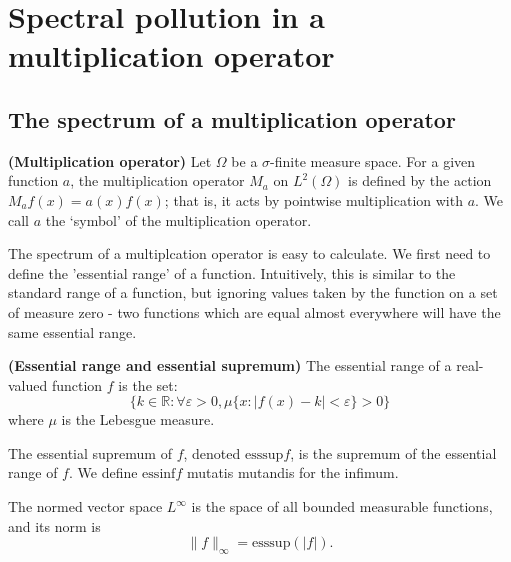 \documentclass[../main.tex]{subfiles}
\begin{document}
\section{Spectral pollution in a multiplication operator}
\subsection{The spectrum of a multiplication operator}
\begin{definition}{\textbf{(Multiplication operator)}}
Let $\Omega$ be a $\sigma$-finite measure space.
For a given function $a$, the multiplication operator $M_a$ on $L^2(\Omega)$ is defined by
the action $M_af(x) = a(x)f(x)$; that is, it acts by pointwise multiplication with $a$. We call $a$ the `symbol' of
the multiplication operator.
\end{definition}

The spectrum of a multiplcation operator is easy to calculate. We first
need to define the 'essential range' of a function. Intuitively, this is
similar to the standard range of a function, but ignoring values taken by
the function on a set of measure zero - two functions which are equal
almost everywhere will have the same essential range.

\begin{definition}{\textbf{(Essential range and essential supremum)}}\label{defn:essential-range}
  The essential range of a real-valued function $f$ is the set:
  $$\{k \in \mathbb{R} : \forall \varepsilon > 0, \mu\{x : |f(x) - k| < \varepsilon\} > 0\}$$
  where $\mu$ is the Lebesgue measure.
  
  The essential supremum of $f$, denoted $\mathrm{esssup}f$, is the supremum of the essential range of $f$. 
  We define $\mathrm{essinf}f$ mutatis mutandis for the infimum.
\end{definition}

The normed vector space $L^\infty$ is the space of all bounded measurable functions, and its norm is $$\|f\|_\infty = \text{esssup}(|f|).$$
\end{document}
